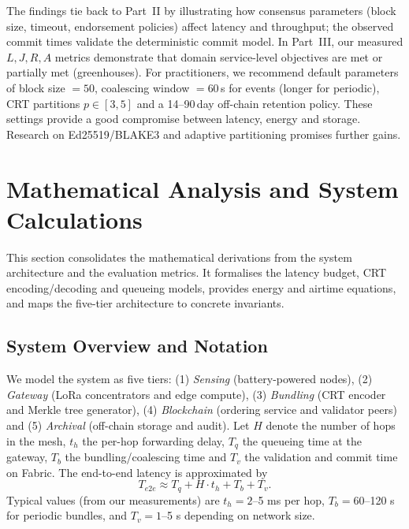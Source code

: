 \documentclass[12pt,onecolumn]{IEEEtran} %
\begin{document}
The findings tie back to Part~II by illustrating how consensus parameters (block size, timeout, endorsement policies) affect latency and throughput; the observed commit times validate the deterministic commit model. In Part~III, our measured $L,J,R,A$ metrics demonstrate that domain service-level objectives are met or partially met (greenhouses). For practitioners, we recommend default parameters of block size $=50$, coalescing window $=60$\,s for events (longer for periodic), CRT partitions $p\in[3,5]$ and a 14–90\,day off-chain retention policy. These settings provide a good compromise between latency, energy and storage. Research on Ed25519/BLAKE3 and adaptive partitioning promises further gains.


\section{Mathematical Analysis and System Calculations}
\label{sec:math-analysis}
This section consolidates the mathematical derivations from the system architecture and the evaluation metrics. It formalises the latency budget, CRT encoding/decoding and queueing models, provides energy and airtime equations, and maps the five-tier architecture to concrete invariants.

\subsection{System Overview and Notation}
We model the system as five tiers: (1) \emph{Sensing} (battery-powered nodes),
(2) \emph{Gateway} (LoRa concentrators and edge compute),
(3) \emph{Bundling} (CRT encoder and Merkle tree generator),
(4) \emph{Blockchain} (ordering service and validator peers) and
(5) \emph{Archival} (off-chain storage and audit).  Let \(H\) denote the number of hops in the mesh, \(t_h\) the per-hop forwarding delay, \(T_q\) the queueing time at the gateway, \(T_b\) the bundling/coalescing time and \(T_v\) the validation and commit time on Fabric.
The end-to-end latency is approximated by
\begin{equation}
T_{e2e} \approx T_q + H \cdot t_h + T_b + T_v.
\end{equation}
Typical values (from our measurements) are \(t_h=2\)–5 ms per hop, \(T_b=60\)–120 s for periodic bundles, and \(T_v=1\)–5 s depending on network size.
\end{document}
